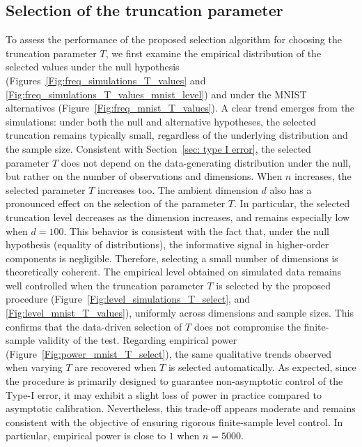 \documentclass[twoside,11pt]{article}
\begin{document}
\subsection{Selection of the truncation parameter}\label{sec:selection T}
To assess the performance of the proposed selection algorithm for choosing the truncation parameter $T$, we first examine the empirical distribution of the selected values under the null hypothesis (Figures~\ref{Fig:freq_simulations_T_values} and \ref{Fig:freq_simulations_T_values_mnist_level}) and under the MNIST alternatives (Figure~\ref{Fig:freq_mnist_T_values}). A clear trend emerges from the simulations: under both the null and alternative hypotheses, the selected truncation remains typically small, regardless of the underlying distribution and the sample size. Consistent with Section~\ref{sec: type I error}, the selected parameter $T$ does not depend on the data-generating distribution under the null, but rather on the number of observations and dimensions. When $n$ increases, the selected parameter $T$ increases too. The ambient dimension $d$ also has a pronounced effect on the selection of the parameter $T$. In particular, the selected truncation level decreases as the dimension increases, and remains especially low when $d=100$. This behavior is consistent with the fact that, under the null hypothesis (equality of distributions), the informative signal in higher-order components is negligible. Therefore, selecting a small number of dimensions is theoretically coherent. The empirical level obtained on simulated data remains well controlled when the truncation parameter $T$ is selected by the proposed procedure (Figure~\ref{Fig:level_simulations_T_select}, and \ref{Fig:level_mnist_T_values}), uniformly across dimensions and sample sizes. This confirms that the data-driven selection of $T$ does not compromise the finite-sample validity of the test. Regarding empirical power (Figure~\ref{Fig:power_mnist_T_select}), the same qualitative trends observed when varying $T$ are recovered when $T$ is selected automatically. As expected, since the procedure is primarily designed to guarantee non-asymptotic control of the Type-I error, it may exhibit a slight loss of power in practice compared to asymptotic calibration. Nevertheless, this trade-off appears moderate and remains consistent with the objective of ensuring rigorous finite-sample level control. In particular, empirical power is close to $1$ when $n=5000$.


\end{document}
